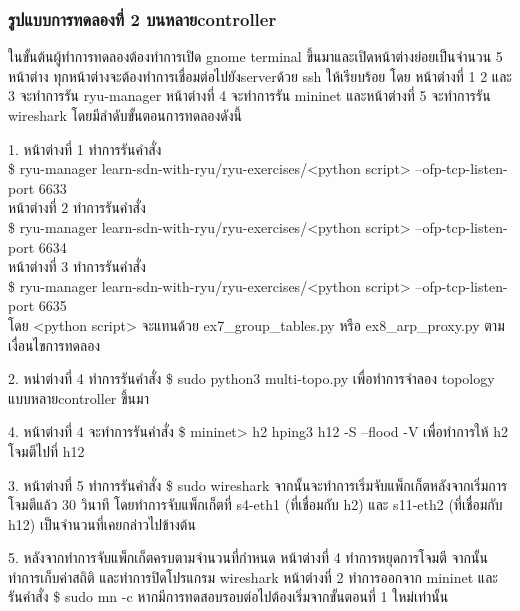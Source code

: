 \subsubsection*{รูปแบบการทดลองที่ 2 บนหลาย\gls{controller}}

ในขั้นต้นผู้ทำการทดลองต้องทำการเปิด gnome terminal ขึ้นมาและเปิดหน้าต่างย่อยเป็นจำนวน 5 หน้าต่าง
ทุกหน้าต่างจะต้องทำการเชื่อมต่อไปยัง\gls{server}ด้วย ssh ให้เรียบร้อย
โดย หน้าต่างที่ 1 2 และ 3 จะทำการรัน ryu-manager หน้าต่างที่ 4 จะทำการรัน mininet และหน้าต่างที่ 5 จะทำการรัน wireshark
โดยมีลำดับขั้นตอนการทดลองดังนี้

1. หน้าต่างที่ 1 ทำการรันคำสั่ง \\
\$ ryu-manager learn-sdn-with-ryu/ryu-exercises/<python script> --ofp-tcp-listen-port 6633 \\
\indent หน้าต่างที่ 2 ทำการรันคำสั่ง \\
\$ ryu-manager learn-sdn-with-ryu/ryu-exercises/<python script> --ofp-tcp-listen-port 6634  \\
\indent หน้าต่างที่ 3 ทำการรันคำสั่ง \\
\$ ryu-manager learn-sdn-with-ryu/ryu-exercises/<python script> --ofp-tcp-listen-port 6635  \\
โดย <python script> จะแทนด้วย 
ex7\_group\_tables.py หรือ ex8\_arp\_proxy.py
ตามเงื่อนไขการทดลอง

2. หน่าต่างที่ 4 ทำการรันคำสั่ง    
\$ sudo python3 multi-topo.py เพื่อทำการจำลอง topology แบบหลาย\gls{controller} ขึ้นมา

4. หน้าต่างที่ 4 จะทำการรันคำสั่ง \$ mininet> h2 hping3 h12 -S --flood -V
เพื่อทำการให้ h2 โจมตีไปที่ h12

3. หน้าต่างที่ 5 ทำการรันคำสั่ง 
\$ sudo wireshark 
จากนั้นจะทำการเริ่มจับแพ็กเก็ตหลังจากเริ่มการโจมตีแล้ว 30 วินาที
โดยทำการจับแพ็กเก็ตที่ s4-eth1 (ที่เชื่อมกับ h2) และ s11-eth2 (ที่เชื่อมกับ h12) เป็นจำนวนที่เคยกล่าวไปข้างต้น

5. หลังจากทำการจับแพ็กเก็ตครบตามจำนวนที่กำหนด หน้าต่างที่ 4 ทำการหยุดการโจมตี จากนั้นทำการเก็บค่าสถิติ และทำการปิดโปรแกรม wireshark
หน้าต่างที่ 2 ทำการออกจาก mininet และรันคำสั่ง \$ sudo mn -c หากมีการทดสอบรอบต่อไปต้องเริ่มจากขั้นตอนที่ 1 ใหม่เท่านั้น
\\\\
